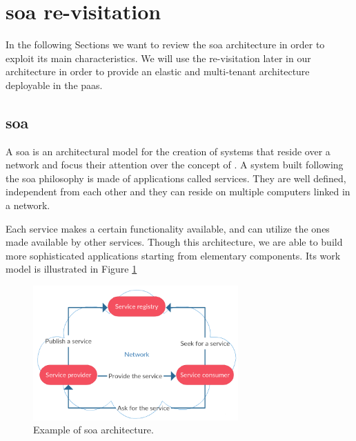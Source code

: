 %
%
\section{\acs{soa} re-visitation}
\label{sec:architecture-soaRevisitation}
In the following Sections we want to review the \ac{soa} architecture in order to exploit its main
characteristics. We will use the re-visitation later in our architecture in order to provide an
elastic and multi-tenant architecture deployable in the \ac{paas}.

\subsection{\acf{soa}}
A \acf{soa} is an architectural model for the creation of systems that reside over a network and
focus their attention over the concept of . A system built following the \ac{soa}
philosophy is made of applications called services. They are well defined, independent from each
other and they can reside on multiple computers linked in a network.

Each service makes a certain functionality available, and can utilize the ones made available by other
services. Though this architecture, we are able to build more sophisticated applications starting from
elementary components. Its work model is illustrated in Figure \ref{img:architecture-soaRevisitation-workmodel}

\begin{figure}
	\centering{}
	\includegraphics[width=0.7\textwidth]{chapters/architecture/images/soa-workmodel.png}
	\caption[Example of \acs{soa} architecture]{Example of \acf{soa} architecture.}
	\label{img:architecture-soaRevisitation-workmodel}
\end{figure} 

